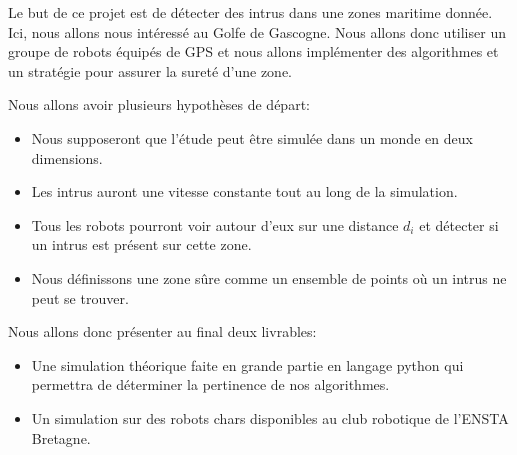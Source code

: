 \bigskip

Le but de ce projet est de détecter des intrus dans une zones maritime donnée. Ici, nous allons nous intéressé au Golfe de Gascogne. Nous allons donc utiliser un groupe de robots équipés de GPS et nous allons implémenter des algorithmes et un stratégie pour assurer la sureté d'une zone. 

\bigskip

Nous allons avoir plusieurs hypothèses de départ:
\begin{itemize}
\item Nous supposeront que l'étude peut être simulée dans un monde en deux dimensions.
\item Les intrus auront une vitesse constante tout au long de la simulation.
\item Tous les robots pourront voir autour d'eux sur une distance $d_{i}$ et détecter si  un intrus est présent sur cette zone.
\item Nous définissons une zone sûre comme un ensemble de points où un intrus ne peut se trouver.
\end{itemize}

\bigskip

Nous allons donc présenter au final deux livrables:
\begin{itemize}
\item Une simulation théorique faite en grande partie en langage python qui permettra de déterminer la pertinence de nos algorithmes.
\item Un simulation sur des robots chars disponibles au club robotique de l'ENSTA Bretagne.
\end{itemize} 

